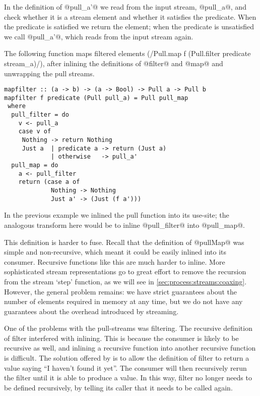 In the definition of @pull_a'@ we read from the input stream, @pull_a@, and check whether it is a stream element and whether it satisfies the predicate.
When the predicate is satisfied we return the element; when the predicate is unsatisfied we call @pull_a'@, which reads from the input stream again.

The following function maps filtered elements (\Hs/Pull.map f (Pull.filter predicate stream_a)/), after inlining the definitions of @filter@ and @map@ and unwrapping the pull streams.

\begin{lstlisting}
mapfilter :: (a -> b) -> (a -> Bool) -> Pull a -> Pull b
mapfilter f predicate (Pull pull_a) = Pull pull_map
 where
  pull_filter = do
    v <- pull_a
    case v of
     Nothing -> return Nothing
     Just a  | predicate a -> return (Just a)
             | otherwise   -> pull_a'
  pull_map = do
    a <- pull_filter
    return (case a of
             Nothing -> Nothing
             Just a' -> (Just (f a')))
\end{lstlisting}

In the previous example we inlined the pull function into its use-site; the analogous transform here would be to inline @pull_filter@ into @pull_map@.

This definition is harder to fuse. Recall that the definition of @pullMap@ was simple and non-recursive, which meant it could be easily inlined into its consumer.
Recursive functions like this are much harder to inline.
More sophisticated stream representations go to great effort to remove the recursion from the stream `step' function, as we will see in \autoref{sec:process:streams:coaxing}.
However, the general problem remains: we have strict guarantees about the number of elements required in memory at any time, but we do not have any guarantees about the overhead introduced by streaming.

One of the problems with the pull-streams was filtering.
The recursive definition of filter interfered with inlining.
This is because the consumer is likely to be recursive as well, and inlining a recursive function into another recursive function is difficult.
The solution offered by \citet{coutts2007stream} is to allow the definition of filter to return a value saying ``I haven't found it yet''.
The consumer will then recursively rerun the filter until it is able to produce a value.
In this way, filter no longer needs to be defined recursively, by telling its caller that it needs to be called again.


